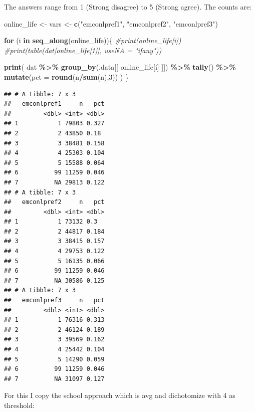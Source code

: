 \documentclass[
]{article}
\newenvironment{Shaded}{\begin{snugshade}}{\end{snugshade}}
\newcommand{\AttributeTok}[1]{\textcolor[rgb]{0.13,0.29,0.53}{#1}}
\newcommand{\CommentTok}[1]{\textcolor[rgb]{0.56,0.35,0.01}{\textit{#1}}}
\newcommand{\ControlFlowTok}[1]{\textcolor[rgb]{0.13,0.29,0.53}{\textbf{#1}}}
\newcommand{\DecValTok}[1]{\textcolor[rgb]{0.00,0.00,0.81}{#1}}
\newcommand{\FunctionTok}[1]{\textcolor[rgb]{0.13,0.29,0.53}{\textbf{#1}}}
\newcommand{\NormalTok}[1]{#1}
\newcommand{\OtherTok}[1]{\textcolor[rgb]{0.56,0.35,0.01}{#1}}
\newcommand{\SpecialCharTok}[1]{\textcolor[rgb]{0.81,0.36,0.00}{\textbf{#1}}}
\newcommand{\StringTok}[1]{\textcolor[rgb]{0.31,0.60,0.02}{#1}}
\begin{document}
The answers range from 1 (Strong disagree) to 5 (Strong agree). The
counts are:

\begin{Shaded}
\begin{Highlighting}[]
\NormalTok{online\_life }\OtherTok{\textless{}{-}}\NormalTok{ vars }\OtherTok{\textless{}{-}} \FunctionTok{c}\NormalTok{(}\StringTok{"emconlpref1"}\NormalTok{, }\StringTok{"emconlpref2"}\NormalTok{, }\StringTok{"emconlpref3"}\NormalTok{)}

\ControlFlowTok{for}\NormalTok{ (i }\ControlFlowTok{in} \FunctionTok{seq\_along}\NormalTok{(online\_life))\{}
  \CommentTok{\#print(online\_life[i])}
  \CommentTok{\#print(table(dat[online\_life[1]], useNA = "ifany"))}
  
  \FunctionTok{print}\NormalTok{(}
\NormalTok{    dat }\SpecialCharTok{\%\textgreater{}\%} 
      \FunctionTok{group\_by}\NormalTok{(.data[[ online\_life[i] ]]) }\SpecialCharTok{\%\textgreater{}\%} 
      \FunctionTok{tally}\NormalTok{() }\SpecialCharTok{\%\textgreater{}\%}
      \FunctionTok{mutate}\NormalTok{(}\AttributeTok{pct =} \FunctionTok{round}\NormalTok{(n}\SpecialCharTok{/}\FunctionTok{sum}\NormalTok{(n),}\DecValTok{3}\NormalTok{))}
\NormalTok{  )}
\NormalTok{\}}
\end{Highlighting}
\end{Shaded}

\begin{verbatim}
## # A tibble: 7 x 3
##   emconlpref1     n   pct
##         <dbl> <int> <dbl>
## 1           1 79803 0.327
## 2           2 43850 0.18 
## 3           3 38481 0.158
## 4           4 25303 0.104
## 5           5 15588 0.064
## 6          99 11259 0.046
## 7          NA 29813 0.122
## # A tibble: 7 x 3
##   emconlpref2     n   pct
##         <dbl> <int> <dbl>
## 1           1 73132 0.3  
## 2           2 44817 0.184
## 3           3 38415 0.157
## 4           4 29753 0.122
## 5           5 16135 0.066
## 6          99 11259 0.046
## 7          NA 30586 0.125
## # A tibble: 7 x 3
##   emconlpref3     n   pct
##         <dbl> <int> <dbl>
## 1           1 76316 0.313
## 2           2 46124 0.189
## 3           3 39569 0.162
## 4           4 25442 0.104
## 5           5 14290 0.059
## 6          99 11259 0.046
## 7          NA 31097 0.127
\end{verbatim}

For this I copy the school approach which is avg and dichotomize with 4
as threshold:
\end{document}
